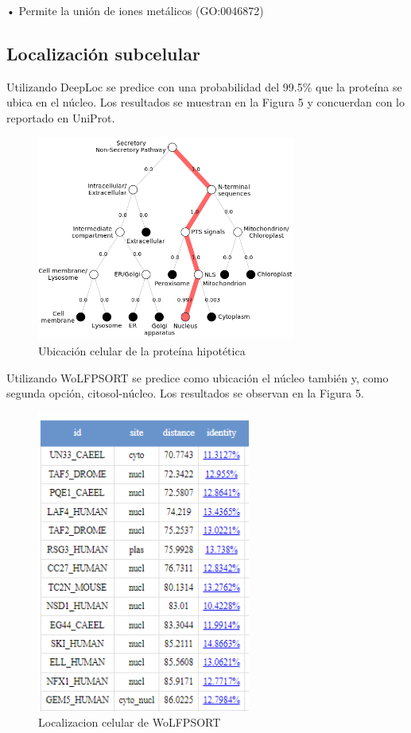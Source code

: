\documentclass[journal,transmag]{IEEEtran}
\begin{document}
    • Permite la unión de iones metálicos (GO:0046872)

\subsection{\textbf{ Localización subcelular}}
Utilizando DeepLoc se predice con una probabilidad del 99.5\% que la proteína se ubica en el núcleo. Los resultados se muestran en la Figura 5 y concuerdan con lo reportado en UniProt.
\begin{figure}[!h]
	\center
	\includegraphics[width=8.5cm]{imagenes/localizacion.png}
	\caption{Ubicación celular de la proteína hipotética}
	\label{4}
\end{figure}

Utilizando WoLFPSORT se predice como ubicación el núcleo también y, como segunda opción, citosol-núcleo. Los resultados se observan en la Figura 5. 
\begin{figure}[!h]
	\center
	\includegraphics[width=7cm]{imagenes/loca.png}
	\caption{Localizacion celular de WoLFPSORT}
	\label{5}
\end{figure}
\end{document}
